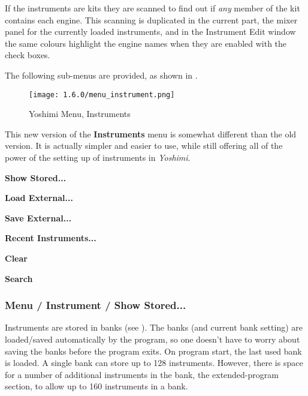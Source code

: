    If the instruments are kits they are scanned to find out if
   \textsl{any} member of the kit contains each engine.
   This scanning is duplicated in the current part, the mixer panel for the
   currently loaded instruments, and in the Instrument Edit window the same
   colours highlight the engine names when they are enabled with the check
   boxes.

   The following sub-menus are provided, as shown in
   .

\begin{figure}[H]
   \centering
   \texttt{[image: 1.6.0/menu\_instrument.png]}
   \caption{Yoshimi Menu, Instruments}
   \label{fig:yoshimi_instrument_menu}
\end{figure}

   This new version of the \textbf{Instruments}
   menu is somewhat different than
   the old version.  It is actually simpler and easier to use, while still
   offering all of the power of the setting up of instruments in
   \textsl{Yoshimi}.

   \begin{enumber}
      \item \textbf{Show Stored...}
      \item \textbf{Load External...}
      \item \textbf{Save External...}
      \item \textbf{Recent Instruments...}
      \item \textbf{Clear}
      \item \textbf{Search}
   \end{enumber}


\subsubsection{Menu / Instrument / Show Stored...}
\label{subsubsec:menu_instrument_show}

   Instruments are stored in banks
   (see ).
   The banks (and current bank setting) are
   loaded/saved automatically by the program, so one doesn't have to worry
   about saving the banks before the program exits. On program start, the last
   used bank is loaded. A single bank can store up to 128 instruments.
   However, there is space for a number of additional instruments in the bank,
   the extended-program section, to allow up to 160 instruments in a bank.

